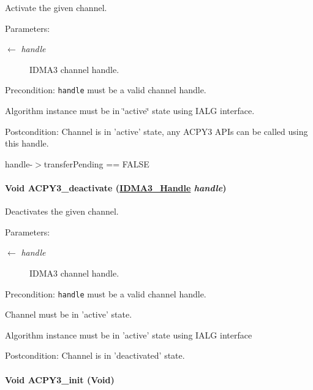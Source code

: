 Activate the given channel. 

\begin{Desc}
\item[Parameters:]
\begin{description}
\item[\mbox{$\leftarrow$} {\em handle}]IDMA3 channel handle.\end{description}
\end{Desc}
\begin{Desc}
\item[Precondition:]{\tt handle} must be a valid channel handle.

Algorithm instance must be in \char`\"{}active\char`\"{} state using IALG interface.\end{Desc}
\begin{Desc}
\item[Postcondition:]Channel is in 'active' state, any ACPY3 APIs can be called using this handle.

handle-$>$transfer\-Pending == FALSE \end{Desc}
\hypertarget{group___d_s_p_a_c_p_y3_g2736d2e136e868577a71710571027de5}{
\paragraph[ACPY3\_\-deactivate]{\setlength{\rightskip}{0pt plus 5cm}Void ACPY3\_\-deactivate (\hyperlink{struct_i_d_m_a3___obj}{IDMA3\_\-Handle} {\em handle})}\hfill}
\label{group___d_s_p_a_c_p_y3_g2736d2e136e868577a71710571027de5}


Deactivates the given channel. 

\begin{Desc}
\item[Parameters:]
\begin{description}
\item[\mbox{$\leftarrow$} {\em handle}]IDMA3 channel handle.\end{description}
\end{Desc}
\begin{Desc}
\item[Precondition:]{\tt handle} must be a valid channel handle.

Channel must be in 'active' state.

Algorithm instance must be in 'active' state using IALG interface\end{Desc}
\begin{Desc}
\item[Postcondition:]Channel is in 'deactivated' state. \end{Desc}
\hypertarget{group___d_s_p_a_c_p_y3_gc79227aad8cb9f68ab67da77de81fd17}{
\paragraph[ACPY3\_\-init]{\setlength{\rightskip}{0pt plus 5cm}Void ACPY3\_\-init (Void)}\hfill}
\label{group___d_s_p_a_c_p_y3_gc79227aad8cb9f68ab67da77de81fd17}


